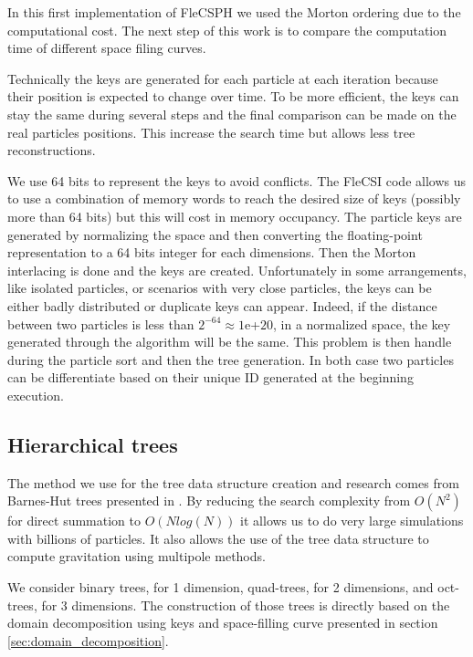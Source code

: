 In this first implementation of FleCSPH we used the Morton ordering due to the computational cost. 
The next step of this work is to compare the computation time of different space filing curves. 

Technically the keys are generated for each particle at each iteration because their position is expected to change over time. 
To be more efficient, the keys can stay the same during several steps and the final comparison can be made on the real particles positions. 
This increase the search time but allows less tree reconstructions.

We use 64 bits to represent the keys to avoid conflicts.
The FleCSI code allows us to use a combination of memory words to reach the desired size of keys (possibly more than 64 bits) but this will cost in memory occupancy. 
The particle keys are generated by normalizing the space and then converting the floating-point representation to a 64 bits integer for each dimensions. 
Then the Morton interlacing is done and the keys are created. 
Unfortunately in some arrangements, like isolated particles, or scenarios with very close particles, the keys can be either badly distributed or duplicate keys can appear. 
Indeed, if the distance between two particles is less than $2^{-64} \approx 1$e+$20$, in a normalized space, the key generated through the algorithm will be the same. 
This problem is then handle during the particle sort and then the tree generation. 
In both case two particles can be differentiate based on their unique ID generated at the beginning execution. 

\subsection{Hierarchical trees}
\label{sec:trees}

The method we use for the tree data structure creation and research comes from Barnes-Hut trees presented in \cite{barnes1986hierarchical,barnes1990modified}. 
By reducing the search complexity from $O(N^2)$ for direct summation to $O(Nlog(N))$ it allows us to do very large simulations with billions of particles. 
It also allows the use of the tree data structure to compute gravitation using multipole methods.

We consider binary trees, for 1 dimension, quad-trees, for 2 dimensions, and oct-trees, for 3 dimensions. 
The construction of those trees is directly based on the domain decomposition using keys and space-filling curve presented in section \ref{sec:domain_decomposition}. 

